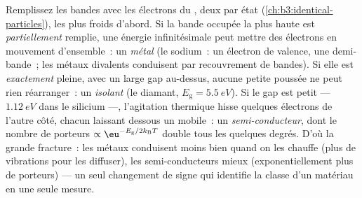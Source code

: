 \begin{definition}\label{def:b3:electrons-in-solids:classes}
Remplissez les bandes avec les électrons du , deux par état
(\cref{ch:b3:identical-particles}), les plus froids d'abord. Si la
bande occupée la plus haute est \emph{partiellement} remplie, une
énergie infinitésimale peut mettre des électrons en mouvement
d'ensemble~: un \emph{métal} (le sodium~: un électron de valence,
une demi-bande~; les métaux divalents conduisent par recouvrement de
bandes). Si elle est \emph{exactement} pleine, avec un large gap
au-dessus, aucune petite poussée ne peut rien réarranger~: un
\emph{isolant} (le diamant, $E_{\text{g}} = \qty{5.5}{eV}$). Si le
gap est petit --- $\qty{1.12}{eV}$ dans le silicium ---, l'agitation
thermique hisse quelques électrons de l'autre côté, chacun laissant
dessous un \emph{} mobile~: un \emph{semi-conducteur}, dont le
nombre de porteurs $\propto\eu^{-E_{\text{g}}/2k_{\text{B}}T}$ double
tous les quelques degrés. D'où la grande fracture~: les métaux
conduisent moins bien quand on les chauffe (plus de vibrations pour
les diffuser), les semi-conducteurs mieux (exponentiellement plus de
porteurs) --- un seul changement de signe qui identifie la classe d'un
matériau en une seule mesure.
\end{definition}

